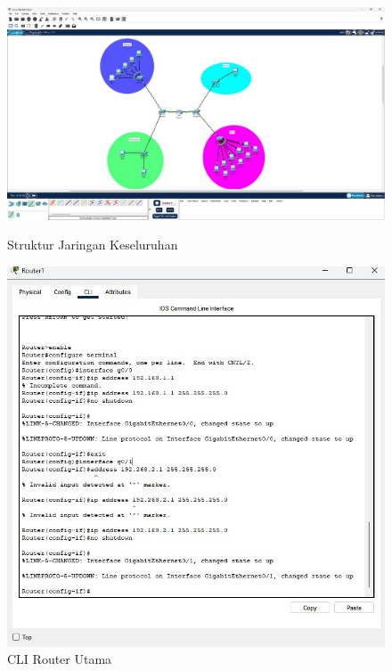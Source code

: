 \begin{figure}[H]
  \centering
  \begin{minipage}[t]{0.48\textwidth}
    \centering
    \includegraphics[width=\linewidth]{P1/img/Struktur.jpeg}
    \caption{Struktur Jaringan Keseluruhan}
    \label{fig:struktur}
  \end{minipage}
  \hfill
  \begin{minipage}[t]{0.48\textwidth}
    \centering
    \includegraphics[width=\linewidth]{P1/img/CLI Config.jpeg}
    \caption{CLI Router Utama}
    \label{fig:cli}
  \end{minipage}
\end{figure}

